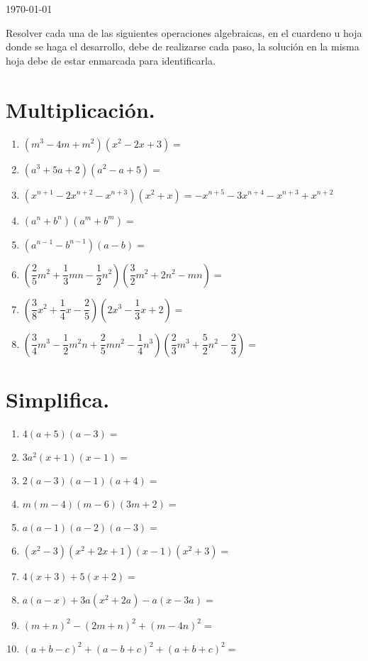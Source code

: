 \documentclass[14pt]{extarticle}
\begin{document}
\begin{center}
\today
\end{center}

Resolver cada una de las siguientes operaciones algebraicas, en el cuardeno u hoja donde se haga el desarrollo, debe de realizarse cada paso, la solución en la misma hoja debe de estar enmarcada para identificarla.

\section{Multiplicación.}

\begin{enumerate}
\item $(m^{3} - 4 m + m^{2})(x^{2} - 2 x + 3) =$ 
\item $(a^{3} +5 a+ 2)(a^{2} - a + 5) = $
\item $(x^{n+1} - 2 x^{n+2} - x^{n+3})(x^{2} + x) = -x^{n+5} - 3 x^{n+4} - x^{n+3} + x^{n+2}$
\item $(a^{n} + b^{n})(a^{m} + b^{m}) = $
\item $(a^{n-1} - b^{n-1})(a - b) = $
\item $\left( \dfrac{2}{5} m^{2} + \dfrac{1}{3} m n - \dfrac{1}{2} n^{2} \right) \left( \dfrac{3}{2} m^{2} + 2 n^{2} - m n \right) = $
\item $\left( \dfrac{3}{8} x^{2} + \dfrac{1}{4} x - \dfrac{2}{5} \right) \left( 2 x^{3} - \dfrac{1}{3} x + 2 \right) = $
\item $\left( \dfrac{3}{4} m^{3} - \dfrac{1}{2} m^{2} n + \dfrac{2}{5} m n^{2} - \dfrac{1}{4} n^{3} \right) \left( \dfrac{2}{3} m^{3} + \dfrac{5}{2} n^{2} - \dfrac{2}{3}\right) = $
\end{enumerate}

\section{Simplifica.}

\begin{enumerate}
\item $4 (a + 5)(a - 3) = $
\item $3 a^{2} (x + 1)(x - 1) =$
\item $2 (a - 3)(a - 1)(a + 4) =$
\item $m (m - 4)(m - 6)(3 m + 2) =$
\item $a (a - 1)(a - 2)(a - 3) = $
\item $(x^{2} - 3)(x^{2} + 2 x + 1)(x - 1)(x^{2} + 3) =$
\item $4 (x + 3) +  5 (x + 2) =$
\item $a (a - x) +  3 a (x^{2} + 2 a) - a (x - 3 a) =$
\item $(m + n)^{2} - (2 m + n)^{2} + (m - 4 n)^{2} =$
\item $(a + b - c)^{2} + (a - b + c)^{2} + (a + b + c)^{2} =$
\end{enumerate}
\end{document}
